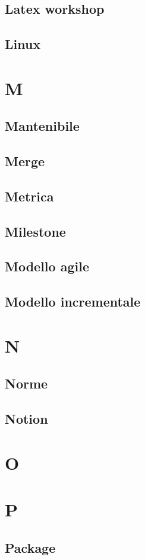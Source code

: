 \documentclass[12pt]{article}
\begin{document}
		\subsection{Latex workshop}
		\subsection{Linux}
	\clearpage
	\section{M}
		\subsection{Mantenibile}
		\subsection{Merge}
		\subsection{Metrica}
		\subsection{Milestone}
		\subsection{Modello agile}
		\subsection{Modello incrementale}
	\clearpage
	\section{N}
		\subsection{Norme}
		\subsection{Notion}
	\clearpage
	\section{O}
	\clearpage
	\section{P}
		\subsection{Package}
\end{document}
